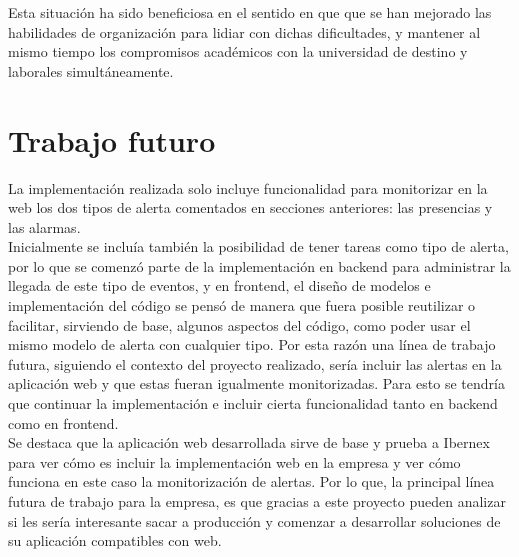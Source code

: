 Esta situación ha sido beneficiosa en el sentido en que que se han mejorado las habilidades de organización para lidiar con dichas dificultades, y mantener al mismo tiempo los compromisos académicos con la universidad de destino y laborales simultáneamente.


\section{Trabajo futuro}


La implementación realizada solo incluye funcionalidad para monitorizar en la web los dos tipos de alerta comentados en secciones anteriores: las presencias y las alarmas.\\

Inicialmente se incluía también la posibilidad de tener tareas como tipo de alerta, por lo que se comenzó parte de la implementación en backend para administrar la llegada de este tipo de eventos, y en frontend, el diseño de modelos e implementación del código se pensó de manera que fuera posible reutilizar o facilitar, sirviendo de base, algunos aspectos del código, como poder usar el mismo modelo de alerta con cualquier tipo.
Por esta razón una línea de trabajo futura, siguiendo el contexto del proyecto realizado, sería incluir las alertas en la aplicación web y que estas fueran igualmente monitorizadas. Para esto se tendría que continuar la implementación e incluir cierta funcionalidad tanto en backend como en frontend.\\

Se destaca que la aplicación web desarrollada sirve de base y prueba a Ibernex para ver cómo es incluir la implementación web en la empresa y ver cómo funciona en este caso la monitorización de alertas. Por lo que, la principal línea futura de trabajo para la empresa, es que gracias a este proyecto pueden analizar si les sería interesante sacar a producción y comenzar a desarrollar soluciones de su aplicación compatibles con web.